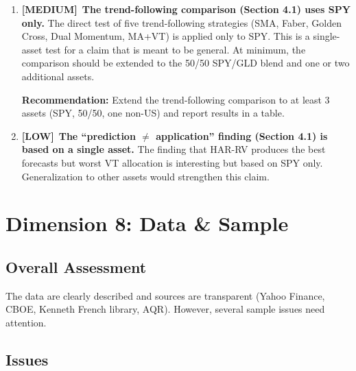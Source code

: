\documentclass[12pt,a4paper]{article}
\newcommand{\MEDIUM}{\textcolor{medsev}{\textbf{[MEDIUM]}}}
\newcommand{\LOW}{\textcolor{lowsev}{\textbf{[LOW]}}}
\begin{document}
\begin{enumerate}[label=\textbf{7.\arabic*}]
\item \MEDIUM\ \textbf{The trend-following comparison (Section 4.1) uses SPY only.}
The direct test of five trend-following strategies (SMA, Faber, Golden Cross, Dual Momentum, MA+VT) is applied only to SPY. This is a single-asset test for a claim that is meant to be general. At minimum, the comparison should be extended to the 50/50 SPY/GLD blend and one or two additional assets.

\textbf{Recommendation:} Extend the trend-following comparison to at least 3 assets (SPY, 50/50, one non-US) and report results in a table.

\item \LOW\ \textbf{The ``prediction $\neq$ application'' finding (Section 4.1) is based on a single asset.}
The finding that HAR-RV produces the best forecasts but worst VT allocation is interesting but based on SPY only. Generalization to other assets would strengthen this claim.

\end{enumerate}


\section{Dimension 8: Data \& Sample}

\subsection*{Overall Assessment}
The data are clearly described and sources are transparent (Yahoo Finance, CBOE, Kenneth French library, AQR). However, several sample issues need attention.

\subsection*{Issues}
\end{document}
